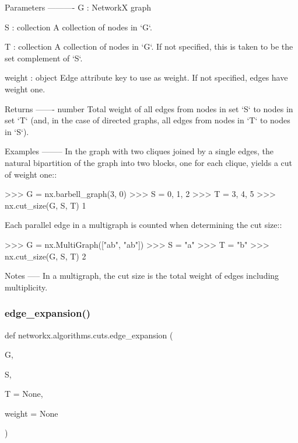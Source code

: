 \begin{DoxyVerb}
\begin{DoxyVerb}
Parameters
----------
G : NetworkX graph

S : collection
    A collection of nodes in `G`.

T : collection
    A collection of nodes in `G`. If not specified, this is taken to
    be the set complement of `S`.

weight : object
    Edge attribute key to use as weight. If not specified, edges
    have weight one.

Returns
-------
number
    Total weight of all edges from nodes in set `S` to nodes in
    set `T` (and, in the case of directed graphs, all edges from
    nodes in `T` to nodes in `S`).

Examples
--------
In the graph with two cliques joined by a single edges, the natural
bipartition of the graph into two blocks, one for each clique,
yields a cut of weight one::

    >>> G = nx.barbell_graph(3, 0)
    >>> S = {0, 1, 2}
    >>> T = {3, 4, 5}
    >>> nx.cut_size(G, S, T)
    1

Each parallel edge in a multigraph is counted when determining the
cut size::

    >>> G = nx.MultiGraph(["ab", "ab"])
    >>> S = {"a"}
    >>> T = {"b"}
    >>> nx.cut_size(G, S, T)
    2

Notes
-----
In a multigraph, the cut size is the total weight of edges including
multiplicity.\end{DoxyVerb}
 \mbox{\label{namespacenetworkx_1_1algorithms_1_1cuts_ac90454cac45ff9549676b947df4aece8}} 
\subsubsection{\texorpdfstring{edge\+\_\+expansion()}{edge\_expansion()}}
{\footnotesize\ttfamily def networkx.\+algorithms.\+cuts.\+edge\+\_\+expansion (\begin{DoxyParamCaption}\item[{}]{G,  }\item[{}]{S,  }\item[{}]{T = {\ttfamily None},  }\item[{}]{weight = {\ttfamily None} }\end{DoxyParamCaption})}


\end{DoxyVerb}

